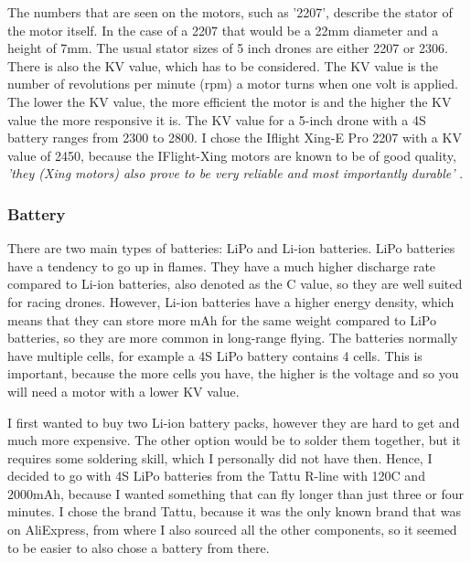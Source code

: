\documentclass[svgnames]{article}
\begin{document}
	The numbers that are seen on the motors, such as '2207', describe the stator of the motor itself. In the case of a 2207 that would be a 22mm diameter and a height of 7mm. The usual stator sizes of 5 inch drones are either 2207 or 2306. There is also the KV value, which has to be considered. The KV value is the number of revolutions per minute (rpm) a motor turns when one volt is applied. The lower the KV value, the more efficient the motor is and the higher the KV value the more responsive it is. The KV value for a 5-inch drone with a 4S battery ranges from 2300 to 2800. I chose the Iflight Xing-E Pro 2207\cite{xingepro} with a KV value of 2450, because the IFlight-Xing motors are known to be of good quality, \textit{'they (Xing motors) also prove to be very reliable and most importantly durable'} \textcite{xingreview}. 


	
	\subsubsection{Battery}
	There are two main types of batteries: \gls{LiPo} and \gls{Li-ion} batteries. \gls{LiPo} batteries have a tendency to go up in flames. They have a much higher discharge rate compared to \gls{Li-ion} batteries, also denoted as the C value, so they are well suited for racing drones. However, \gls{Li-ion} batteries have a higher energy density, which means that they can store more mAh for the same weight compared to \gls{LiPo} batteries, so they are more common in long-range flying. The batteries normally have multiple cells, for example a 4S \gls{LiPo} battery contains 4 cells. This is important, because the more cells you have, the higher is the voltage and so you will need a motor with a lower KV value. 
	
	I first wanted to buy two \gls{Li-ion} battery packs, however they are hard to get and much more expensive. The other option would be to solder them together, but it requires some soldering skill, which I personally did not have then. Hence, I decided to go with 4S \gls{LiPo} batteries from the Tattu R-line with 120C and 2000mAh\cite{tattu}, because I wanted something that can fly longer than just three or four minutes. I chose the brand Tattu, because it was the only known brand that was on AliExpress, from where I also sourced all the other components, so it seemed to be easier to also chose a battery from there. 
	
\end{document}
